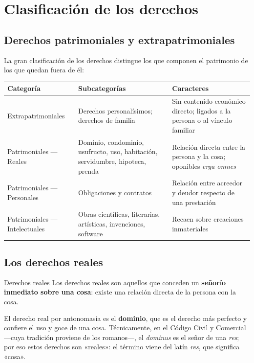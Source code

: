 \documentclass[12pt,oneside]{book}
\newenvironment{tabla}{%
    \par\medskip\begingroup\small\renewcommand{\arraystretch}{1.3}\noindent\ignorespaces
}{%
    \par\endgroup\medskip
}
\begin{document}
\chapter{Clasificación de los derechos}

\section{Derechos patrimoniales y extrapatrimoniales}

La gran clasificación de los derechos distingue los que componen el patrimonio de los que quedan fuera de él:

\begin{tabla}
\begin{tabularx}{\textwidth}{B{4.0cm}YY}
\toprule
Categoría & \textbf{Subcategorías} & \textbf{Caracteres} \\
\midrule
Extrapatrimoniales & Derechos personalísimos; derechos de familia & Sin contenido económico directo; ligados a la persona o al vínculo familiar \\
Patrimoniales --- Reales & Dominio, condominio, usufructo, uso, habitación, servidumbre, hipoteca, prenda & Relación directa entre la persona y la cosa; oponibles \textit{erga omnes} \\
Patrimoniales --- Personales & Obligaciones y contratos & Relación entre acreedor y deudor respecto de una prestación \\
Patrimoniales --- Intelectuales & Obras científicas, literarias, artísticas, invenciones, software & Recaen sobre creaciones inmateriales \\
\bottomrule
\end{tabularx}
\end{tabla}

\section{Los derechos reales}

\begin{definition}{Derechos reales}
Los derechos reales son aquellos que conceden un \textbf{señorío inmediato sobre una cosa}: existe una relación directa de la persona con la cosa.
\end{definition}

El derecho real por antonomasia es el \textbf{dominio}, que es el derecho más perfecto y confiere el uso y goce de una cosa. Técnicamente, en el Código Civil y Comercial ---cuya tradición proviene de los romanos---, el \textit{dominus} es el señor de una \textit{res}; por eso estos derechos son «reales»: el término viene del latín \textit{res}, que significa «cosa».
\end{document}

